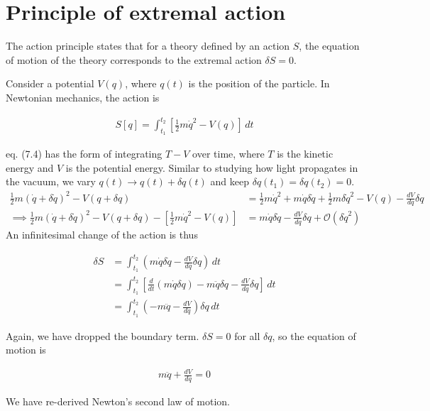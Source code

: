\documentclass[12pt]{book} %
\numberwithin{equation}{chapter}
\def\d{\delta}
\def\bigO{\mathcal{O}}
\begin{document}
\section{Principle of extremal action}
The action principle states that for a theory defined by an action $S$, the equation of motion of the theory corresponds to the extremal action $\d S=0$.
\begin{example}
Consider a potential $V(q)$, where $q(t)$ is the position of the particle. In Newtonian mechanics, the action is
\begin{eqnbox}
\begin{align}
S[q]=\int_{t_{1}}^{t_{2}}\left[\frac{1}{2}m\dot{q}^{2}-V(q)\right]\,dt
\end{align}
\end{eqnbox}
eq. (7.4) has the form of integrating $T-V$ over time, where $T$ is the kinetic energy and $V$ is the potential energy. Similar to studying how light propagates in the vacuum, we vary $q(t)\to q(t)+\d q(t)$ and keep $\d q(t_{1})=\d q(t_{2})=0$.
\begin{align*}
\frac{1}{2}m{\left(\dot{q}+\d \dot{q}\right)}^{2}-V(q+\d q)&=\frac{1}{2}m\dot{q}^{2}+m\dot{q}\d \dot{q}+\frac{1}{2}m\d \dot{q}^{2}-V(q)-\frac{dV}{dq}\d q\\
\implies \frac{1}{2}m{\left(\dot{q}+\d \dot{q}\right)}^{2}-V(q+\d q)-\left[\frac{1}{2}m\dot{q}^{2}-V(q)\right]&=m\dot{q}\d \dot{q}-\frac{dV}{dq}\d q+\bigO(\d \dot{q}^{2})
\end{align*}
An infinitesimal change of the action is thus
\begin{eqnbox}
\begin{align}
\d S&=\int_{t_{1}}^{t_{2}}\left(m\dot{q}\d \dot{q}-\frac{dV}{dq}\d q\right)\,dt\nonumber\\
&=\int_{t_{1}}^{t_{2}}\left[\frac{d}{dt}\left(m\dot{q}\d q\right)-m\ddot{q}\d q-\frac{dV}{dq}\d q\right]\,dt\nonumber\\
&=\int_{t_{1}}^{t_{2}}\left(-m\ddot{q}-\frac{dV}{dq}\right)\d q\,dt
\end{align}
\end{eqnbox}
Again, we have dropped the boundary term. $\d S=0$ for all $\d q$, so the equation of motion is
\begin{eqnbox}
\begin{align}
m\ddot{q}+\frac{dV}{dq}=0
\end{align}
\end{eqnbox}
We have re-derived Newton's second law of motion.
\end{example}
\end{document}
